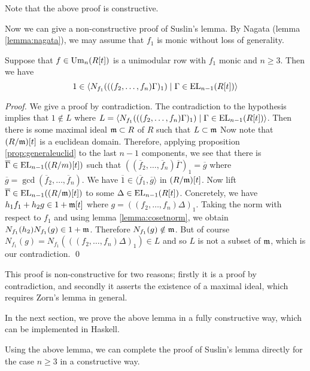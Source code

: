 Note that the above proof is constructive.

Now we can give a non-constructive proof of Suslin's lemma.
By Nagata (lemma \ref{lemma:nagata}), we may assume that $f_1$ is monic without loss of generality.

\begin{lemma}
\label{lemma:suslinconcrete}
  Suppose that $f \in \text{Um}_n(R[t])$ is a unimodular row with $f_1$ monic and $n \geq 3$.
  Then we have
  \[
    1 \in \langle N_{f_1}(((f_2, \dots, f_n) \Gamma)_1) \mid \Gamma \in \text{EL}_{n-1}(R[t]) \rangle
  \]
\end{lemma}
\begin{proof}
  We give a proof by contradiction.
  The contradiction to the hypothesis implies that $1 \notin L$
  where $L = \langle N_{f_1}(((f_2, \dots, f_n) \Gamma)_1) \mid \Gamma \in \text{EL}_{n-1}(R[t]) \rangle$.
  Then there is some maximal ideal $\frak m \subset R$ of $R$ such that $L \subset \frak m$
  Now note that $(R/\frak m)[t]$ is a euclidean domain.
  Therefore, applying proposition \ref{prop:generaleuclid} to the last $n-1$ components, we see that there is $\overline \Gamma \in \text{EL}_{n-1}((R/m)[t])$ such that
  $((\overline f_2, \dots, \overline f_n) \overline \Gamma)_1 = \overline g$ where $\overline g = \gcd(\overline f_2, \dots, \overline f_n)$.
  We have $\overline 1 \in \langle \overline f_1, \overline g \rangle$ in $(R/\frak m)[t]$.
  Now lift $\overline \Gamma \in \text{EL}_{n-1}((R/\frak m)[t])$ to some $\Delta \in \text{EL}_{n-1}(R[t])$.
  Concretely, we have $h_1 f_1 + h_2 g \in 1 + \frak m[t]$ where $g = ((f_2, \dots, f_n) \Delta)_1$.
  Taking the norm with respect to $f_1$ and using lemma \ref{lemma:cosetnorm}, we obtain $N_{f_1}(h_2) N_{f_1}(g) \in 1 + \frak m$.
  Therefore $N_{f_1}(g) \notin \frak m$. But of course $N_{f_1}(g) = N_{f_1}(( (f_2, \dots, f_n) \Delta)_1) \in L$ and so $L$ is not a subset of $\frak m$, which is our contradiction.
  \qed
\end{proof}

This proof is non-constructive for two reasons; firstly it is a proof by contradiction, and secondly it asserts the existence of a maximal ideal, which requires Zorn's lemma in general.

In the next section, we prove the above lemma in a fully constructive way, which can be implemented in Haskell.

Using the above lemma, we can complete the proof of Suslin's lemma directly for the case $n \geq 3$ in a constructive way.

